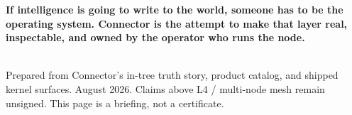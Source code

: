 \documentclass[10pt]{article}
\newcommand{\muted}[1]{\textcolor{textmuted}{#1}}
\begin{document}
\vspace{0.55em}
{\fontsize{11}{14}\selectfont\bfseries\color{navy} If intelligence is going to write to the world, someone has to be the operating system. Connector is the attempt to make that layer real, inspectable, and owned by the operator who runs the node.}

\vspace{0.55em}
\noindent{\color{rule}\rule{\linewidth}{0.5pt}}\\[0.4em]
{\footnotesize\muted{Prepared from Connector's in-tree truth story, product catalog, and shipped kernel surfaces. August 2026. Claims above L4 / multi-node mesh remain unsigned. This page is a briefing, not a certificate.}}
\end{document}
